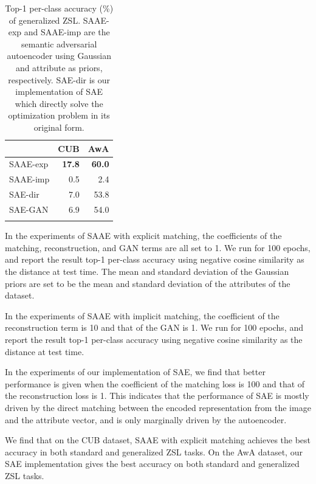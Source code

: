 \documentclass{article}
\begin{document}
\begin{table}[!htb]
\centering
\begin{tabular}{lrr}
\toprule
 & CUB & AwA \\
\midrule
SAAE-exp & \bf{17.8} & \bf{60.0} \\
SAAE-imp & 0.5 & 2.4 \\
SAE-dir & 7.0 & 53.8 \\
SAE-GAN & 6.9 & 54.0 \\
\bottomrule \\
\end{tabular}
\caption{Top-1 per-class accuracy (\%) of generalized ZSL. SAAE-exp and SAAE-imp are the semantic adversarial autoencoder using Gaussian and attribute as priors, respectively. SAE-dir is our implementation of SAE which directly solve the optimization problem in its original form.}
\label{tab:GeneralizedZSL}
\end{table}

In the experiments of SAAE with explicit matching, the coefficients of the matching, reconstruction, and GAN terms are all set to 1. We run for 100 epochs, and report the result top-1 per-class accuracy using negative cosine similarity as the distance at test time. The mean and standard deviation of the Gaussian priors are set to be the mean and standard deviation of the attributes of the dataset.

In the experiments of SAAE with implicit matching, the coefficient of the reconstruction term is 10 and that of the GAN is 1. We run for 100 epochs, and report the result top-1 per-class accuracy using negative cosine similarity as the distance at test time.

In the experiments of our implementation of SAE, we find that better performance is given when the coefficient of the matching loss is 100 and that of the reconstruction loss is 1. This indicates that the performance of SAE is mostly driven by the direct matching between the encoded representation from the image and the attribute vector, and is only marginally driven by the autoencoder.


We find that on the CUB dataset, SAAE with explicit matching achieves the best accuracy in both standard and generalized ZSL tasks. On the AwA dataset, our SAE implementation gives the best accuracy on both standard and generalized ZSL tasks.
\end{document}
